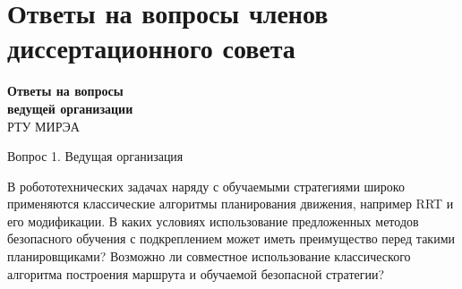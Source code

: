 
\section{Ответы на вопросы членов диссертационного совета}

\newcommand{\qaQuestion}[3]{%
\begin{frame}[noframenumbering]{Вопрос #2. #1}
    \vfill
    \begin{block}{}
        \small #3
    \end{block}
    \vfill
\end{frame}}

\newcommand{\qaTodo}{%
    \vfill
    \centering
    {\Large\color{red}[Ответ дописать]}
    \vfill}


\begin{frame}
    \centering
    \vfill
    {\LARGE\color{MIPTBlue}\textbf{Ответы на вопросы\\[0.2em]
    ведущей организации}}\\[0.6em]
    {\large РТУ МИРЭА}
    \vfill
\end{frame}

\qaQuestion{Ведущая организация}{1}{%
    В робототехнических задачах наряду с обучаемыми стратегиями широко
    применяются классические алгоритмы планирования движения, например RRT и
    его модификации. В каких условиях использование предложенных методов
    безопасного обучения с подкреплением может иметь преимущество перед такими
    планировщиками? Возможно ли совместное использование классического
    алгоритма построения маршрута и обучаемой безопасной стратегии?}

